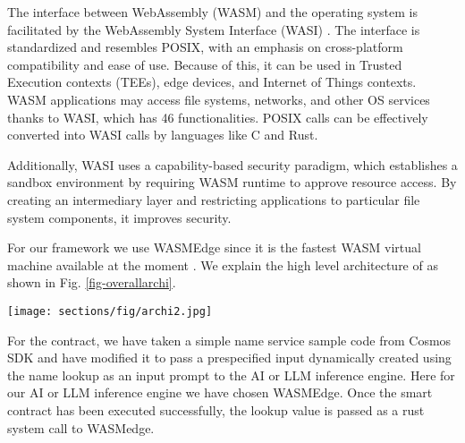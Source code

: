 The interface between WebAssembly (WASM) and the operating system is facilitated by the WebAssembly System Interface (WASI) \cite{clark2019standardizing}. The interface is standardized and resembles POSIX, with an emphasis on cross-platform compatibility and ease of use. Because of this, it can be used in Trusted Execution contexts (TEEs), edge devices, and Internet of Things contexts. WASM applications may access file systems, networks, and other OS services thanks to WASI, which has 46 functionalities. POSIX calls can be effectively converted into WASI calls by languages like C and Rust. 

Additionally, WASI uses a capability-based security paradigm, which establishes a sandbox environment by requiring WASM runtime to approve resource access. By creating an intermediary layer and restricting applications to particular file system components, it improves security.

For our framework we use WASMEdge since it is the fastest WASM virtual machine available at the moment \cite{zheng2020vm,WebAssembly-2024-01-02}. We explain the high level architecture of \sln{} as shown in Fig. \ref{fig-overallarchi}.

\begin{figure*}%
	\centering
	\texttt{[image: sections/fig/archi2.jpg]}
	\caption{Overview of \sln{}.}   
	\label{fig-overallarchi}
\end{figure*}

For the contract, we have taken a simple name service sample code from Cosmos SDK and have modified it to pass a prespecified input dynamically created using the name lookup as an input prompt to the AI or LLM inference engine. Here for our AI or LLM inference engine we have chosen WASMEdge. Once the smart contract has been executed successfully, the lookup value is passed as a rust system call to WASMedge.

